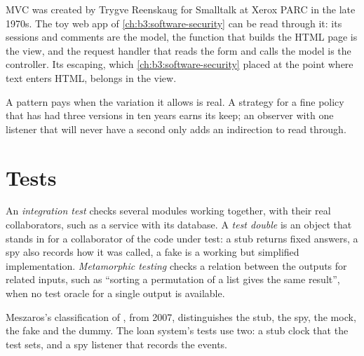 \label{lst:b3:software-engineering:adapter}

MVC was created by Trygve Reenskaug for Smalltalk at Xerox PARC in the late 1970s. %
The toy web app of \cref{ch:b3:software-security} can be read through it: its sessions and comments are the model, the function that builds the HTML page is the view, and the request handler that reads the form and calls the model is the controller. Its escaping, which \cref{ch:b3:software-security} placed at the point where text enters HTML, belongs in the view.

A pattern pays when the variation it allows is real. A strategy for a fine policy that has had three versions in ten years earns its keep; an observer with one listener that will never have a second only adds an indirection to read through.

\section{Tests}\label{sec:b3:software-engineering:tests}

\begin{definition}\label{def:b3:software-engineering:tests}
An \emph{integration test} checks several modules working together, with their real collaborators, such as a service with its database. A \emph{test double} is an object that stands in for a collaborator of the code under test: a stub returns fixed answers, a spy also records how it was called, a fake is a working but simplified implementation. \emph{Metamorphic testing} checks a relation between the outputs for related inputs, such as ``sorting a permutation of a list gives the same result'', when no test oracle for a single output is available.
\end{definition}

Meszaros's classification of , from 2007, distinguishes the stub, the spy, the mock, the fake and the dummy. %
The loan system's tests use two: a stub clock that the test sets, and a spy listener that records the events.

\label{lst:b3:software-engineering:tests}

